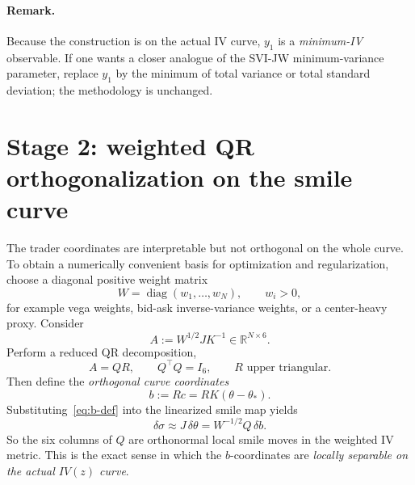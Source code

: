\documentclass[11pt]{article}
\newcommand{\R}{\mathbb{R}}
\begin{document}
\paragraph{Remark.}
Because the construction is on the actual IV curve, $y_1$ is a \emph{minimum-IV} observable. If one wants a closer analogue of the SVI-JW minimum-variance parameter, replace $y_1$ by the minimum of total variance or total standard deviation; the methodology is unchanged.

\section{Stage 2: weighted QR orthogonalization on the smile curve}
The trader coordinates are interpretable but not orthogonal on the whole curve. To obtain a numerically convenient basis for optimization and regularization, choose a diagonal positive weight matrix
\[
W = \operatorname{diag}(w_1,\dots,w_N),
\qquad w_i > 0,
\]
for example vega weights, bid-ask inverse-variance weights, or a center-heavy proxy. Consider
\begin{equation}
A := W^{1/2} J K^{-1} \in \R^{N\times 6}.
\label{eq:A-def}
\end{equation}
Perform a reduced QR decomposition,
\begin{equation}
A = QR,
\qquad Q^\top Q = I_6,
\qquad R \text{ upper triangular}.
\label{eq:qr-decomp}
\end{equation}
Then define the \emph{orthogonal curve coordinates}
\begin{equation}
b := Rc = RK(\theta-\theta_*).
\label{eq:b-def}
\end{equation}
Substituting~\eqref{eq:b-def} into the linearized smile map yields
\begin{equation}
\delta\sigma
\approx J\,\delta\theta
= W^{-1/2}Q\,\delta b.
\label{eq:orthogonal-smile-moves}
\end{equation}
So the six columns of $Q$ are orthonormal local smile moves in the weighted IV metric. This is the exact sense in which the $b$-coordinates are \emph{locally separable on the actual $IV(z)$ curve}.
\end{document}
